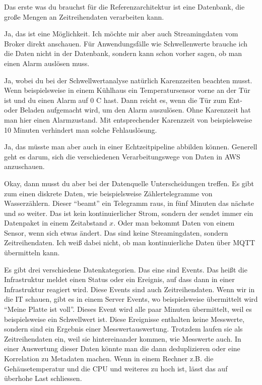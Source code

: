 \PE Das erste was du brauchst für die Referenzarchitektur ist eine Datenbank, die große Mengen an Zeitreihendaten verarbeiten kann.

\LF Ja, das ist eine Möglichkeit. Ich möchte mir aber auch Streamingdaten vom Broker direkt anschauen. Für Anwendungsfälle wie Schwellenwerte brauche ich die Daten nicht in der Datenbank, sondern kann schon vorher sagen, ob man einen Alarm auslösen muss.

\PE Ja, wobei du bei der Schwellwertanalyse natürlich Karenzzeiten beachten musst. Wenn beispielsweise in einem Kühlhaus ein Temperatursensor vorne an der Tür ist und du einen Alarm auf 0 \textdegree{}C hast. Dann reicht es, wenn die Tür zum Ent- oder Beladen aufgemacht wird, um den Alarm auszulösen. Ohne Karenzzeit hat man hier einen Alarmzustand. Mit entsprechender Karenzzeit von beispielsweise 10 Minuten verhindert man solche Fehlauslösung.

\LF Ja, das müsste man aber auch in einer Echtzeitpipeline abbilden können. Generell geht es darum, sich die verschiedenen Verarbeitungswege von Daten in \ac{AWS} anzuschauen. 

\PE Okay, dann musst du aber bei der Datenquelle Unterscheidungen treffen. Es gibt zum einen diskrete Daten, wie beispielsweise Zählertelegramme von Wasserzählern. Dieser \enquote{beamt} ein Telegramm raus, in fünf Minuten das nächste und so weiter. Das ist kein kontinuierlicher Strom, sondern der sendet immer ein Datenpaket in einem Zeitabstand $x$. Oder man bekommt Daten von einem Sensor, wenn sich etwas ändert. Das sind keine Streamingdaten, sondern Zeitreihendaten. Ich weiß dabei nicht, ob man kontinuierliche Daten über \ac{MQTT} übermitteln kann.

Es gibt drei verschiedene Datenkategorien. Das eine sind Events. Das heißt die Infrastruktur meldet einen Status oder ein Ereignis, auf dass dann in einer Infrastruktur reagiert wird. Diese Events sind auch Zeitreihendaten. Wenn wir in die IT schauen, gibt es in einem Server Events, wo beispielsweise übermittelt wird \enquote{Meine Platte ist voll}. Dieses Event wird alle paar Minuten übermittelt, weil es beispielsweise ein Schwellwert ist. Diese Ereignisse enthalten keine Messwerte, sondern sind ein Ergebnis einer Messwertauswertung. Trotzdem laufen sie als Zeitreihendaten ein, weil sie hintereinander kommen, wie Messwerte auch. In einer Auswertung dieser Daten könnte man die dann deduplizieren oder eine Korrelation zu Metadaten machen. Wenn in einem Rechner z.B. die Gehäusetemperatur und die CPU und weiteres zu hoch ist, lässt das auf überhohe Last schliessen. 

